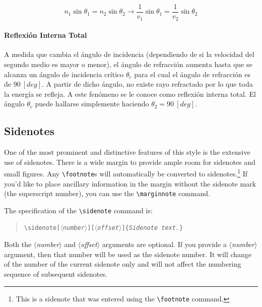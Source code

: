 \documentclass{tufte-handout}
\newcommand{\doccmd}[1]{\texttt{\textbackslash#1}}%
\newcommand{\docopt}[1]{\ensuremath{\langle}\textrm{\textit{#1}}\ensuremath{\rangle}}%
\newcommand{\docarg}[1]{\textrm{\textit{#1}}}%
\newenvironment{docspec}{\begin{quote}\noindent}{\end{quote}}%
\begin{document}
\begin{equation}
n_1 \sin{\theta_1} = n_2 \sin{\theta_2} \rightarrow \frac{1}{v_1}\sin{\theta_1} = \frac{1}{v_2}\sin{\theta_2}
\end{equation}

\paragraph{Reflexión Interna Total}

A medida que cambia el ángulo de incidencia (dependiendo de si la velocidad del segundo medio es mayor o menor), el ángulo de refracción aumenta hasta que se alcanza un ángulo de incidencia crítico $\theta_c$ para el cual el ángulo de refracción es de $90~[deg]$. A partir de dicho ángulo, no existe rayo refractado por lo que toda la energía se refleja. A este fenómeno se le conoce como reflexión interna total. El ángulo $\theta_c$ puede hallarse simplemente haciendo $\theta_2 = 90~[deg]$.

\clearpage

\subsection{Sidenotes}\label{sec:sidenotes}
One of the most prominent and distinctive features of this style is the
extensive use of sidenotes.  There is a wide margin to provide ample room
for sidenotes and small figures.  Any \Verb|\footnote|s will automatically
be converted to sidenotes.\footnote{This is a sidenote that was entered
using the \texttt{\textbackslash footnote} command.}  If you'd like to place ancillary
information in the margin without the sidenote mark (the superscript
number), you can use the \Verb|\marginnote| command.

The specification of the \Verb|\sidenote| command is:
\begin{docspec}
  \doccmd{sidenote[\docopt{number}][\docopt{offset}]\{\docarg{Sidenote text.}\}}
\end{docspec}

Both the \docopt{number} and \docopt{offset} arguments are optional.  If you
provide a \docopt{number} argument, then that number will be used as the
sidenote number.  It will change of the number of the current sidenote only and
will not affect the numbering sequence of subsequent sidenotes.
\end{document}
